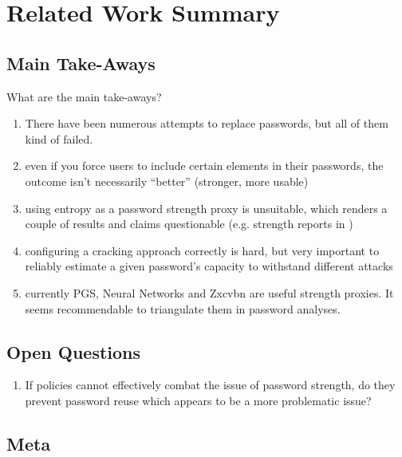 
\chapter[Related Work Summary]{Related Work Summary}\label{chap:rw:summary}


\section{Main Take-Aways}
What are the main take-aways?

\begin{enumerate}
	\item There have been numerous attempts to replace passwords, but all of them kind of failed.
	\item even if you force users to include certain elements in their passwords, the outcome isn't necessarily ``better'' (stronger, more usable)
	\item using entropy as a password strength proxy is unsuitable, which renders a couple of results and claims questionable (e.g. strength reports in \cite{Florencio2007LargeScaleStudyPasswordHabits})
	\item configuring a cracking approach correctly is hard, but very important to reliably estimate a given password's capacity to withstand different attacks \cite{Bonneau2012ScienceOfGuessing, Kelley2012GuessAgain, Ur2015MeasuringRealWorldAccuracies, Weir2009PCFG}
	\item currently PGS, Neural Networks and Zxcvbn are useful strength proxies. It seems recommendable to triangulate them in password analyses.  
\end{enumerate}

\section{Open Questions}
\begin{enumerate}
\item If policies cannot effectively combat the issue of password strength, do they prevent password reuse which appears to be a more problematic issue? 
\end{enumerate}

\section{Meta}

